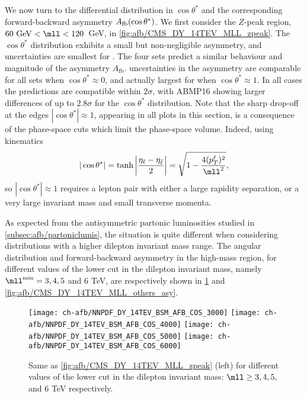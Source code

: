 We now turn to the differential distribution in
  $\cos\theta^*$ 
  and the corresponding forward-backward asymmetry $A_{\rm
    fb}(\cos\theta^*)$.
We first consider the $Z$-peak region, $60~{\rm GeV} < \mll <
120$~GeV, in \cref{fig:afb/CMS_DY_14TEV_MLL_zpeak}.
%
The $\cos\theta^*$ 
distribution exhibits a small but non-negligible asymmetry,
and uncertainties are  smallest for .
%
The four \pdf sets predict a similar behaviour and magnitude
of the asymmetry $A_\mathrm{fb}$.
%
\pdf uncertainties in the asymmetry
are  comparable for  all \pdf sets when $\cos\theta^* \approx0$,
and actually  largest for  when $\cos\theta^* \approx 1$.
In all cases the predictions are compatible within $2 \sigma$,
with ABMP16 showing larger differences of up to $2.8 \sigma$ for the $\cos\theta^*$
distribution.
%
Note that the
sharp drop-off at the edges $|\cos\theta^*| \approx  1$, appearing in
all plots in this section, is a consequence of the phase-space cuts which
limit the phase-space volume.
%
Indeed, using  \lo kinematics
\begin{equation}
| \cos\theta^* | = \tanh \left| \frac{\eta_\ell - \eta_{\bar{\ell}}}{2} \right| = \sqrt{1 - \frac{4 (p_T^\ell)^2}{\mll^2}} \text{,}
\end{equation}
so $| \cos\theta^* | \approx 1$ requires a lepton pair with either
a large rapidity separation, or a very large invariant mass and small
transverse momenta. 

As expected from the antisymmetric partonic luminosities studied in
\cref{subsec:afb/partoniclumis}, the situation is quite different when
considering distributions with a higher dilepton invariant mass range.
%
The angular distribution and forward-backward asymmetry
in the high-mass region, for different values of the  lower cut in the dilepton
 invariant mass, namely $\mll^{\rm min}=3, 4,5$ and 6 TeV, are
 respectively
 shown in
\cref{fig:afb/CMS_DY_14TEV_MLL_others} and \cref{fig:afb/CMS_DY_14TEV_MLL_others_asy}.

\begin{figure}[t!]
 \centering
 \texttt{[image: ch-afb/NNPDF\_DY\_14TEV\_BSM\_AFB\_COS\_3000]}
 \texttt{[image: ch-afb/NNPDF\_DY\_14TEV\_BSM\_AFB\_COS\_4000]}
 \texttt{[image: ch-afb/NNPDF\_DY\_14TEV\_BSM\_AFB\_COS\_5000]}
 \texttt{[image: ch-afb/NNPDF\_DY\_14TEV\_BSM\_AFB\_COS\_6000]}
 \caption{Same as \cref{fig:afb/CMS_DY_14TEV_MLL_zpeak} (left)
   for different values of the  lower cut in the dilepton
   invariant mass: $\mll \ge 3, 4,5,$ and 6 TeV respectively.
  }    
 \label{fig:afb/CMS_DY_14TEV_MLL_others}
\end{figure}


